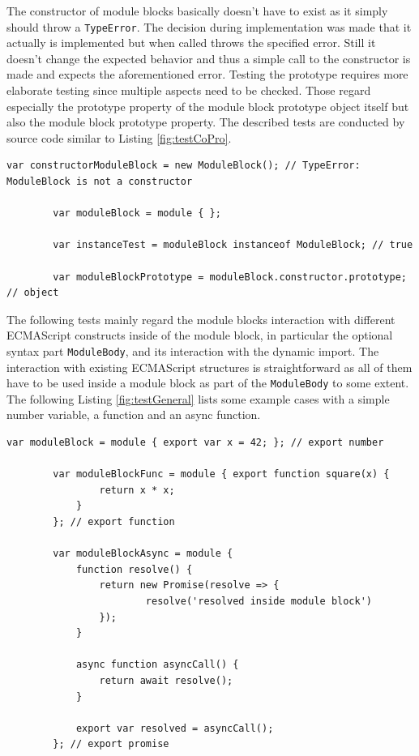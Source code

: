 The constructor of module blocks basically doesn't have to exist as it simply should throw a \linebreak\texttt{TypeError}. The decision during implementation was made that it actually is implemented but when called throws the specified error. Still it doesn't change the expected behavior and thus a simple call to the constructor is made and expects the aforementioned error. Testing the prototype requires more elaborate testing since multiple aspects need to be checked. Those regard especially the prototype property of the module block prototype object itself but also the module block prototype property. The described tests are conducted by source code similar to Listing \ref{fig:testCoPro}.

    \begin{lstlisting}[caption={Module block constructor and prototype tests}, label={fig:testCoPro}]
        var constructorModuleBlock = new ModuleBlock(); // TypeError: ModuleBlock is not a constructor
        
        var moduleBlock = module { };
        
        var instanceTest = moduleBlock instanceof ModuleBlock; // true
        
        var moduleBlockPrototype = moduleBlock.constructor.prototype; // object
    \end{lstlisting}

The following tests mainly regard the module blocks interaction with different ECMAScript constructs inside of the module block, in particular the optional syntax part \texttt{ModuleBody}, and its interaction with the dynamic import. The interaction with existing ECMAScript structures is straightforward as all of them have to be used inside a module block as part of the \texttt{ModuleBody} to some extent. The following Listing \ref{fig:testGeneral} lists some example cases with a simple number variable, a function and an async function.

    \begin{lstlisting}[caption={Module block general test example cases}, label={fig:testGeneral}]
        var moduleBlock = module { export var x = 42; }; // export number
        
        var moduleBlockFunc = module { export function square(x) {
                return x * x;
            } 
        }; // export function
    
        var moduleBlockAsync = module {
            function resolve() {
                return new Promise(resolve => {
                        resolve('resolved inside module block')
                });
            }
        
            async function asyncCall() {
                return await resolve();
            }
        
            export var resolved = asyncCall(); 
        }; // export promise
    \end{lstlisting}

